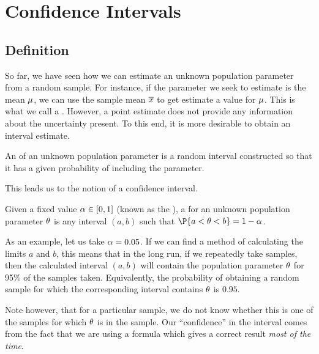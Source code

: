 \chapter{Confidence Intervals}

\section{Definition}

So far, we have seen how we can estimate an unknown population parameter from a random sample. For instance, if the parameter we seek to estimate is the mean $\mu$, we can use the sample mean $\overline{x}$ to get estimate a value for $\mu$. This is what we call a . However, a point estimate does not provide any information about the uncertainty present. To this end, it is more desirable to obtain an interval estimate.

\begin{definition}
    An  of an unknown population parameter is a random interval constructed so that it has a given probability of including the parameter.
\end{definition}

This leads us to the notion of a confidence interval.

\begin{definition}
    Given a fixed value $\alpha \in [0, 1]$ (known as the ), a  for an unknown population parameter $\theta$ is any interval $(a, b)$ such that $\P{a < \t < b} = 1 - \a$.
\end{definition}

As an example, let us take $\alpha = 0.05$. If we can find a method of calculating the limits $a$ and $b$, this means that in the long run, if we repeatedly take samples, then the calculated interval $(a, b)$ will contain the population parameter $\theta$ for 95\% of the samples taken. Equivalently, the probability of obtaining a random sample for which the corresponding interval contains $\theta$ is $0.95$.

Note however, that for a particular sample, we do not know whether this is one of the samples for which $\theta$ is in the sample. Our ``confidence'' in the interval comes from the fact that we are using a formula which gives a correct result \emph{most of the time}.


